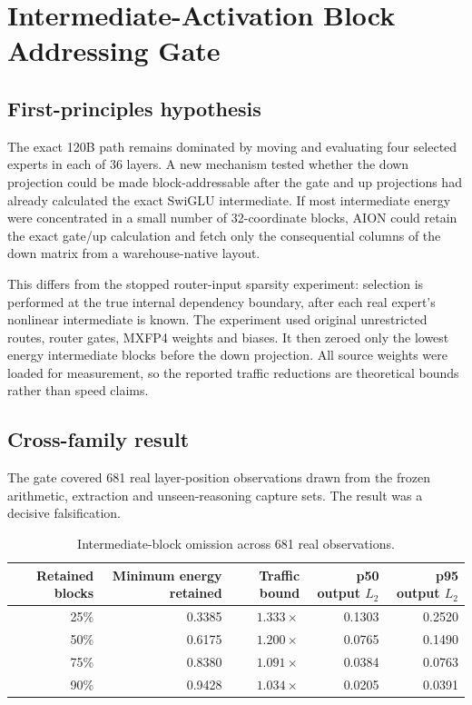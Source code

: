 \section{Intermediate-Activation Block Addressing Gate}

\subsection{First-principles hypothesis}

The exact 120B path remains dominated by moving and evaluating four selected
experts in each of 36 layers.  A new mechanism tested whether the down
projection could be made block-addressable after the gate and up projections
had already calculated the exact SwiGLU intermediate.  If most intermediate
energy were concentrated in a small number of 32-coordinate blocks, AION could
retain the exact gate/up calculation and fetch only the consequential columns
of the down matrix from a warehouse-native layout.

This differs from the stopped router-input sparsity experiment: selection is
performed at the true internal dependency boundary, after each real expert's
nonlinear intermediate is known.  The experiment used original unrestricted
routes, router gates, MXFP4 weights and biases.  It then zeroed only the lowest
energy intermediate blocks before the down projection.  All source weights
were loaded for measurement, so the reported traffic reductions are
theoretical bounds rather than speed claims.

\subsection{Cross-family result}

The gate covered 681 real layer-position observations drawn from the frozen
arithmetic, extraction and unseen-reasoning capture sets.  The result was a
decisive falsification.

\begin{table}[h]
\centering
\begin{tabular}{rrrrr}
\toprule
Retained blocks & Minimum energy retained & Traffic bound & p50 output $L_2$ & p95 output $L_2$ \\
\midrule
25\% & 0.3385 & $1.333\times$ & 0.1303 & 0.2520 \\
50\% & 0.6175 & $1.200\times$ & 0.0765 & 0.1490 \\
75\% & 0.8380 & $1.091\times$ & 0.0384 & 0.0763 \\
90\% & 0.9428 & $1.034\times$ & 0.0205 & 0.0391 \\
\bottomrule
\end{tabular}
\caption{Intermediate-block omission across 681 real observations.}
\end{table}

